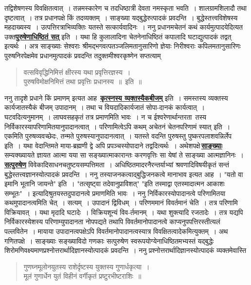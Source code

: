 \documentclass[11pt, openany]{book}
\begin{document}
\noindent तद्विशेषणस्य विवक्षितत्वात्~। तन्नमस्कारेण च तदधिष्ठात्री देवता
नमस्कृता भवति~। शालग्रामशिलादौ तथा दृष्टत्वात्~। तत्र प्रधानपक्षे किं तदव्यक्तम्~।
साङ्ख्या यद्बुद्धेरुत्पादकं प्रवदन्ति~। बुद्धेस्तत्त्वविशेषस्य महदाख्यस्य~।
उत्पत्तिरत्राभिव्यक्तिः यतस्ते सत्कार्यवादिनः~। ननु प्रधानमचेतनं कथं कार्यमुत्पादयेदित्यत उक्त\hyperref[1]{\textbf{पुरुषेणाधिष्ठितं सत्}} इति~। यथा हि कुलालादिना चेतनेनाधिष्ठितं कपालादि घटाद्युत्पादकं तद्वत् इत्यर्थः~। अत्र साङ्ख्याः सेश्वराः श्रीमद्भगवत्पतञ्जलिमतानुसारिणो ज्ञेयाः निरीश्वराः कपिलमतानुसारिणः पुरुषनिरपेक्षमेव प्रधानमुत्पादकं प्रवदन्ति
तदुक्तमीश्वरकृष्णेन सप्तत्याम्\textemdash
\begin{quote}
    \q
     वत्सविवृद्धिनिमित्तं क्षीरस्य यथा प्रवृत्तिरज्ञस्य~। \\

\vspace{-6.5mm}
 पुरुषविमोक्षनिमित्तं तथा प्रवृत्तिः प्रधानस्य~॥~इति~॥
\end{quote}

\indent ननु तादृशे प्रधाने किं प्रमाणम् इत्यत आह\textendash\, \hyperref[1]{\textbf{कृत्स्नस्य व्यक्तस्यैकबीजम्}} इति~। समस्तस्य व्यक्तस्य कार्यजातस्यैकं बीजम् उपादानम्~। तथा च
वियदादिकार्यजातं सोपा-दानकं कार्यत्वात्~। घटवदित्यनुमानम्~। लाघवसहकृतं
तत्र प्रमाणमिति भावः~। न च ईश्वरेणार्थान्तरता~तस्य
निर्विकारस्यापरिणामितयानुपादानत्वात्~। परिणामित्वेऽपि कथम् अचेतनं चेतनपरिणामं स्यात् इति~। एकमिति पुरुषव्यवच्छेदः, तन्मते पुरुषस्यानुपादानत्वात्~। यतस्ते वदन्ति
पुरुषस्तु पुष्करपलाशवन्निर्लेप इति~। यथा वेदान्तिमते माया-ब्रह्मणी द्वे अपि प्रपञ्चस्योपादाने तद्वदित्यर्थः~। अथेशपक्षे\textendash \,\hyperref[1]{\textbf{साङ्ख्याः}}
सम्यक्ख्यायते ज्ञायत आत्मा यया सा सङ्ख्यात्माकारान्तः करणवृत्तिः सा येषां ते साङ्ख्या आत्मज्ञानिनः~। \hyperref[1]{\textbf{सत्पुरुषेण}} विवेकादिसाधनचतुष्टयसम्पत्तिमता~।
अधिष्ठितमादरनैरन्तर्याभ्यां श्रवणादिविषयीकृतं सन्तं बुद्धेस्तत्त्वज्ञानस्योत्पादकं प्रवदन्ति~। 
ननु तस्याजनकत्वाद्बुद्धिजनकत्वे मानाभाव इत्यत आह~।
{\qt "यतो वा इमानि भूतानि जायन्ते"} इति~।
{\qt "तत्सृष्ट्वा तदेवानुप्राविशत्"} {\qt "इति तस्माद्वा एतस्मादात्मन आकाशः सम्भूतः"}~।
इत्यादिश्रुतयस्तदुपादानत्वे प्रमाणमिति भावः~। 
ननु निर्विकारस्योपादानत्वे
\newpage
\noindent परिणामितया कथमुपादानत्वमिति चेत्~। सत्यम्~। उपादानं द्विविधम्~।
परिणममानं विवर्तमानं चेति~। तत्र परिणामि विक्रियावत्~। 
यथा मृदादि घटादेः~। विक्रियशून्यं विव-र्तमानम्~। यथा शुक्त्यादि रजतादेः~। 
तत्र यद्यपि निर्विकारस्येशस्य परिणाम्युपादानता नोपपद्यते तथापि
विवर्तमानोपादानत्वे काप्यनुपपत्तिरस्तीत्यलं पल्लवितेन~। 
मायाया उपादानत्वपक्षेऽपि विवर्तमानोपादानत्वस्यात्र विवक्षितत्वादेकमित्युक्तम्~। 
अथ गणितपक्षे~।
साङ्ख्याः सङ्ख्याविदो गणकाः सत्पुरुषेण स्वरूपयोग्येनाधिष्ठितमभ्यस्तं
यद्बुद्धेः शिरोमणिवक्ष्यमाणप्रश्नोत्तरार्थादिज्ञानस्योत्पादकं प्रवदन्ति~। 
ननु प्रश्नोत्तरार्थादिज्ञानस्योत्पादकं व्यक्तमेवास्ति\textemdash  
\begin{quote}
    \q\onehalfspacing
    गुणघ्नमूलोनयुतस्य राशेर्दृष्टस्य युक्तस्य गुणार्धकृत्या~।\\
 मूलं गुणार्धेन युतं विहीनं वर्गीकृतं प्रष्टुरभीष्टराशिः~॥~
\end{quote}
 
\end{document}

